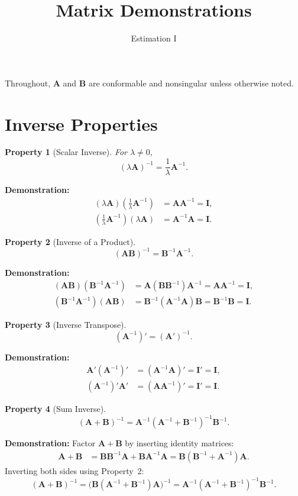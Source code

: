 \documentclass[11pt]{article}
\title{\vspace{-1.5em}Matrix Demonstrations}
\author{Estimation I}
\date{}
\newtheorem{property}{Property}
\newcommand{\Ainv}{\bm{A}^{-1}}
\newcommand{\Binv}{\bm{B}^{-1}}
\newcommand{\A}{\bm{A}}
\newcommand{\B}{\bm{B}}
\newcommand{\I}{\bm{I}}
\begin{document}
\maketitle
\vspace{-2.5em}

\noindent Throughout, $\A$ and $\B$ are conformable and nonsingular unless otherwise noted.

\section*{Inverse Properties}

\begin{property}[Scalar Inverse]
For $\lambda \neq 0$,
\[
(\lambda \A)^{-1} = \frac{1}{\lambda}\Ainv.
\]
\end{property}

\textbf{Demonstration:}
\begin{align*}
(\lambda\A)\left(\tfrac{1}{\lambda}\Ainv\right) &= \A\Ainv = \I, \\
\left(\tfrac{1}{\lambda}\Ainv\right)(\lambda\A) &= \Ainv\A = \I.
\end{align*}

\begin{property}[Inverse of a Product]
\[
(\A\B)^{-1} = \Binv\Ainv.
\]
\end{property}

\textbf{Demonstration:}
\begin{align*}
(\A\B)(\Binv\Ainv) &= \A(\B\Binv)\Ainv = \A\Ainv = \I, \\
(\Binv\Ainv)(\A\B) &= \Binv(\Ainv\A)\B = \Binv\B = \I.
\end{align*}

\begin{property}[Inverse Transpose]
\[
(\Ainv)' = (\A')^{-1}.
\]
\end{property}

\textbf{Demonstration:}
\begin{align*}
\A'(\Ainv)' &= (\Ainv\A)' = \I' = \I, \\
(\Ainv)'\A' &= (\A\Ainv)' = \I' = \I.
\end{align*}

\begin{property}[Sum Inverse]
\[
(\A+\B)^{-1} = \Ainv(\Ainv + \Binv)^{-1}\Binv.
\]
\end{property}

\textbf{Demonstration:} Factor $\A + \B$ by inserting identity matrices:
\begin{align*}
\A + \B &= \B\Binv\A + \B\Ainv\A
        = \B(\Binv + \Ainv)\A.
\end{align*}
Inverting both sides using Property~2:
\[
(\A+\B)^{-1} = \bigl(\B(\Ainv+\Binv)\A\bigr)^{-1}
             = \Ainv(\Ainv+\Binv)^{-1}\Binv.
\]
\end{document}
